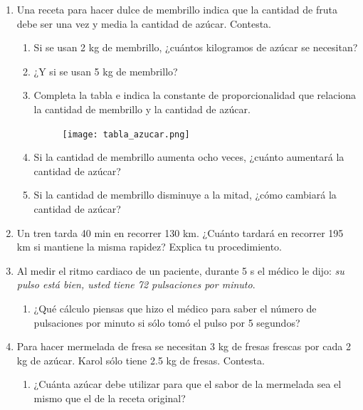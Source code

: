 \begin{enumerate}
    \item Una receta para hacer dulce de membrillo indica que la cantidad de fruta debe
          ser una vez y media la cantidad de azúcar. Contesta.
          \begin{enumerate}
              \item Si se usan 2 kg de membrillo, ¿cuántos kilogramos de azúcar se necesitan?
              \item ¿Y si se usan 5 kg de membrillo?
              \item Completa la tabla e indica la constante de proporcionalidad que relaciona la cantidad
                    de membrillo y la cantidad de azúcar.
                    \begin{figure}[H]
                        \centering
                        \texttt{[image: tabla\_azucar.png]}
                        \label{tab:tabla_azucar}
                    \end{figure}
              \item Si la cantidad de membrillo aumenta ocho veces, ¿cuánto aumentará la cantidad
                    de azúcar?
              \item Si la cantidad de membrillo disminuye a la mitad, ¿cómo cambiará la cantidad de
                    azúcar?
          \end{enumerate}
    \item Un tren tarda 40 min en recorrer 130 km. ¿Cuánto tardará en recorrer 195 km si
          mantiene la misma rapidez? Explica tu procedimiento.
    \item Al medir el ritmo cardiaco de un paciente, durante 5 s el médico le dijo: \emph{su
              pulso está bien, usted tiene 72 pulsaciones por minuto}.
          \begin{enumerate}
              \item ¿Qué cálculo piensas que hizo el médico para saber el número de pulsaciones
                    por minuto si sólo tomó el pulso por 5 segundos?
          \end{enumerate}
    \item Para hacer mermelada de fresa se necesitan 3 kg de fresas frescas por cada 2 kg
          de azúcar. Karol sólo tiene 2.5 kg de fresas. Contesta.
          \begin{enumerate}
              \item ¿Cuánta azúcar debe utilizar para que el sabor de la mermelada sea el mismo que
                    el de la receta original?

\end{enumerate}
\end{enumerate}
